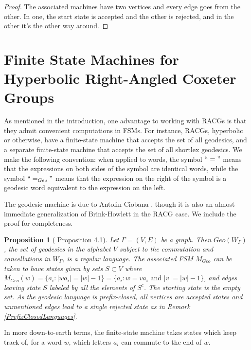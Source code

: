 \documentclass[10pt,a4paper]{amsart}
\newtheorem{proposition}[theorem]{Proposition}
\theoremstyle{definition}
\theoremstyle{remark}
\begin{document}
	\begin{proof}
		The associated machines have two vertices and every edge goes from the other. In one, the start state is accepted and the other is rejected, and in the other it's the other way around.
	\end{proof}
	
	\section{Finite State Machines for Hyperbolic Right-Angled Coxeter Groups}
	\label{sec:FSMs}
	
	As mentioned in the introduction, one advantage to working with RACGs is that they admit convenient computations in FSMs. For instance, RACGs, hyperbolic or otherwise, have a finite-state machine that accepts the set of all geodesics, and a separate finite-state machine that accepts the set of all shortlex geodesics. We make the following convention: when applied to words, the symbol $``="$ means that the expressions on both sides of the symbol are identical words, while the symbol $``=_{Geo}"$ means that the expression on the right of the symbol is a geodesic word equivalent to the expression on the left.

    The geodesic machine is due to Antolin-Ciobanu \cite{AntolinCiobanu}, though it is also an almost immediate generalization of Brink-Howlett in the RACG case. We include the proof for completeness.
    
	\begin{proposition} [\cite{AntolinCiobanu} Proposition 4.1]
		
		Let $\Gamma=(V,E)$ be a graph. Then $Geo(W_\Gamma)$, the set of geodesics in the alphabet $V$ subject to the commutation and cancellations in $W_\Gamma$, is a regular language. The associated FSM $M_{Geo}$ can be taken to have states given by sets $S\subset V$ where \newline $M_{Geo}(w)=\{a_i: |wa_i|=|w|-1\}=\{a_i: w=va_i \text{ and } |v|=|w|-1\}$, and edges leaving state $S$ labeled by all the elements of $S^c$. The starting state is the empty set. As the geodesic language is prefix-closed, all vertices are accepted states and unmentioned edges lead to a single rejected state as in Remark \ref{PrefixClosedLanguages}.
		
	\end{proposition}
	
	In more down-to-earth terms, the finite-state machine takes states which keep track of, for a word $w$, which letters $a_i$ can commute to the end of $w$.
	
\end{document}
